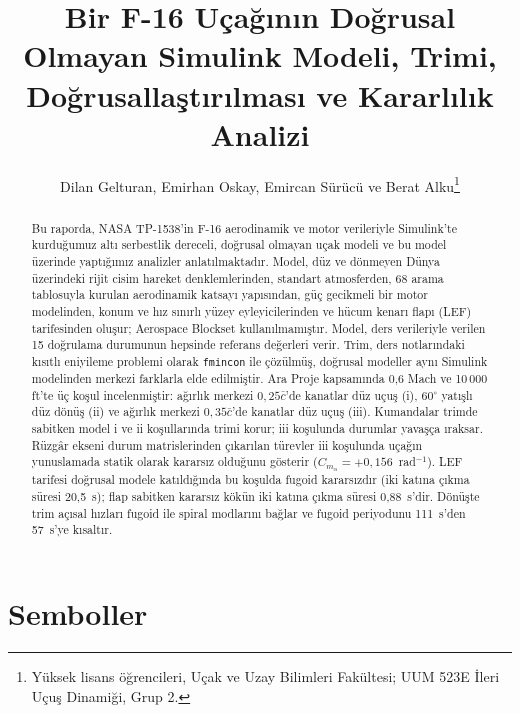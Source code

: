 \documentclass[conf]{new-aiaa}
\title{Bir F-16 Uçağının Doğrusal Olmayan Simulink Modeli, Trimi, Doğrusallaştırılması ve Kararlılık Analizi}
\author{Dilan Gelturan, Emirhan Oskay, Emircan Sürücü ve Berat Alku\footnote{Yüksek lisans öğrencileri, Uçak ve Uzay Bilimleri Fakültesi; UUM 523E İleri Uçuş Dinamiği, Grup 2.}}
\affil{İstanbul Teknik Üniversitesi, 34469 Maslak, İstanbul, Türkiye}
\begin{document}
\maketitle

\begin{abstract}
Bu raporda, NASA TP-1538'in F-16 aerodinamik ve motor verileriyle Simulink'te kurduğumuz altı serbestlik dereceli, doğrusal olmayan uçak modeli ve bu model üzerinde yaptığımız analizler anlatılmaktadır. Model, düz ve dönmeyen Dünya üzerindeki rijit cisim hareket denklemlerinden, standart atmosferden, 68 arama tablosuyla kurulan aerodinamik katsayı yapısından, güç gecikmeli bir motor modelinden, konum ve hız sınırlı yüzey eyleyicilerinden ve hücum kenarı flapı (LEF) tarifesinden oluşur; Aerospace Blockset kullanılmamıştır. Model, ders verileriyle verilen 15 doğrulama durumunun hepsinde referans değerleri verir. Trim, ders notlarındaki kısıtlı eniyileme problemi olarak \texttt{fmincon} ile çözülmüş, doğrusal modeller aynı Simulink modelinden merkezi farklarla elde edilmiştir. Ara Proje kapsamında 0,6 Mach ve 10\,000 ft'te üç koşul incelenmiştir: ağırlık merkezi $0,25\bar c$'de kanatlar düz uçuş (i), $60^\circ$ yatışlı düz dönüş (ii) ve ağırlık merkezi $0,35\bar c$'de kanatlar düz uçuş (iii). Kumandalar trimde sabitken model i ve ii koşullarında trimi korur; iii koşulunda durumlar yavaşça ıraksar. Rüzgâr ekseni durum matrislerinden çıkarılan türevler iii koşulunda uçağın yunuslamada statik olarak kararsız olduğunu gösterir ($C_{m_\alpha}=+0,156$~rad$^{-1}$). LEF tarifesi doğrusal modele katıldığında bu koşulda fugoid kararsızdır (iki katına çıkma süresi 20,5~s); flap sabitken kararsız kökün iki katına çıkma süresi 0,88~s'dir. Dönüşte trim açısal hızları fugoid ile spiral modlarını bağlar ve fugoid periyodunu 111~s'den 57~s'ye kısaltır.
\end{abstract}

\section*{Semboller}
\end{document}
